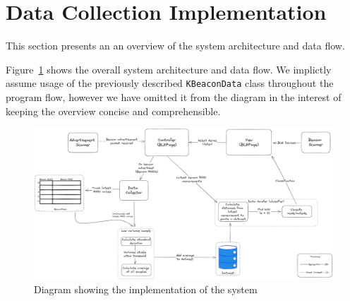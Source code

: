 




\section{Data Collection Implementation}\label{sec:data_collection_implementation}
This section presents an an overview of the system architecture and data flow.

Figure~\ref{fig:implementation_diagram} shows the overall system architecture and data flow.
We implictly assume usage of the previously described \texttt{KBeaconData} class throughout the program flow, however we have omitted it from the diagram in the interest of keeping the overview concise and comprehensible.

\begin{figure}[h!]
  \centering
  \includegraphics[width=1\textwidth]{images/implementation-diagram.png}
  \caption{Diagram showing the implementation of the system}
  \label{fig:implementation_diagram}
\end{figure}

